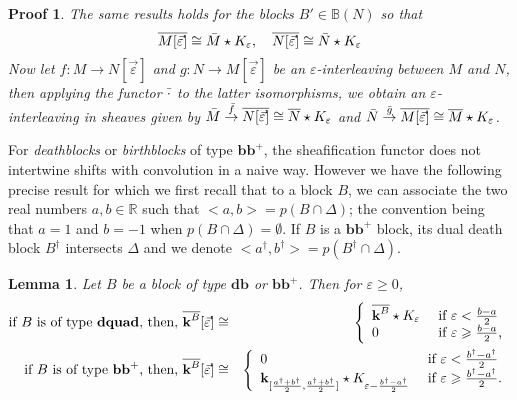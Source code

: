 \documentclass[a4paper, english, 11pt]{article}
\newcommand{\kk}[0]{\textbf{k}}
\newcommand{\0}{\vec{0}}
\newcommand{\R}[0]{\mathbb{R}}
\newtheorem*{pf}{Proof} }
\newtheorem{lem}[prop]{Lemma}
\begin{document}
\begin{pf}
 \smallskip
 
 The same results holds for  the blocks $B'\in 
 \mathbb{B}(N)$ so that 
 $$\overline{M [\vec{\varepsilon}]} \cong \Bar{M}\star K_{\varepsilon}, \quad  \overline{N [\vec{\varepsilon}]} \cong \Bar{N}\star K_{\varepsilon}$$
 Now let $f: M\to N[\vec{\varepsilon}]$ and $g: N\to M[\vec{\varepsilon}]$ be an $\varepsilon$-interleaving between $M$ and $N$, then applying the functor $\Bar{\cdot}$ to the latter isomorphisms, we obtain  an $\varepsilon$-interleaving in sheaves given by  
 $ \Bar{M}\stackrel{\Bar{f}}\to \overline{N[\vec{\varepsilon}]}\cong \overline{N}\star K_\varepsilon$ 
 and $\Bar{N}\stackrel{\Bar{g}}\to \overline{M[\vec{\varepsilon}]}\cong \overline{M}\star K_{\varepsilon}$.
\end{pf}

For \emph{deathblocks} or \emph{birthblocks} of type $\textbf{bb}^{+}$, the sheafification functor does not intertwine shifts with convolution in a naive way. 
However we have the following precise result for which we first 
recall that to a block $B$, we can associate the two real numbers $a,b\in \R$ such that $<a,b> = p(B\cap \Delta)$;  the convention being that $a=1$ and $b=-1$ when $ p(B\cap \Delta) = \emptyset$. 
If $B$ is a $\textbf{bb}^{+}$ block, its dual death block $B^\dagger$ intersects $\Delta$ and we denote $<a^\dagger,b^\dagger> = p(B^\dagger \cap \Delta)$.
\begin{lem}\label{L:Barondeathblocks}Let $B$ be a block of type $\textbf{db}$ or $\textbf{bb}^{+}$.  Then for $\varepsilon \geq 0$,
 \begin{eqnarray}
 \text{if $B$ is of type \textbf{dquad}, then, } \overline{\kk^{B}}[\vec{\varepsilon}] 
 & \cong & \left\{ \begin{array}{ll}  \overline{\kk^{B}}\star K_{\varepsilon} & \mbox{ if $\varepsilon< \frac{b-a}{2}$}\\
 0 & \mbox{ if $\varepsilon \geqslant \frac{b-a}{2}$,} \end{array}                                                                                                                          \right .  \label{eq:Barofdb}\\
 \text{if $B$ is of type $\textbf{bb}^{+}$, then, }\overline{\kk^{B}}[\vec{\varepsilon}] 
 & \cong &   \left\{ \begin{array}{ll}  0 & \mbox{ if $\varepsilon< \frac{b^\dagger-a^\dagger}{2}$}\\
 \kk_{[\frac{a^\dagger+b^\dagger}{2}, \frac{a^\dagger+b^\dagger}{2}]}\star K_{\varepsilon -\frac{b^\dagger -a^\dagger}{2}} & \mbox{ if $\varepsilon \geqslant \frac{b^\dagger-a^\dagger}{2}$.} \end{array}                                                                                                                          \right .  \label{eq:Barofbb+}
 \end{eqnarray}
\end{lem}
\end{document}
